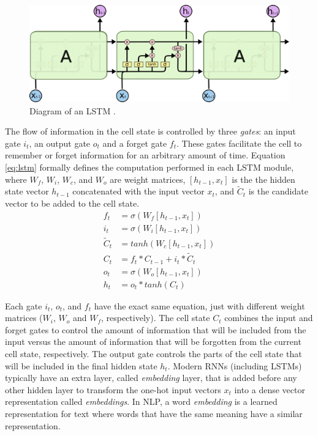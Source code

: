 \begin{figure}[!h]
\centering
\includegraphics[width=0.9\columnwidth]{imgs/background/lstm.png}
\caption{Diagram of an LSTM \cite{olah2015understanding}.}
\label{fig:lstm}
\end{figure}

The flow of information in the cell state is controlled by three \textit{gates}: an input gate $i_t$, an output gate $o_t$ and a forget gate $f_t$. These gates facilitate the cell to remember or forget information for an arbitrary amount of time. Equation \ref{eq:lstm} formally defines the computation performed in each LSTM module, where $W_f$, $W_i$, $W_c$, and $W_o$ are weight matrices, $[h_{t-1}, x_t]$ is the the hidden state vector $h_{t-1}$ concatenated with the input vector $x_t$, and $\tilde{C}_t$ is the candidate vector to be added to the cell state.
\begin{equation} \label{eq:lstm}
\begin{split}
    f_t &= \sigma(W_f[h_{t-1}, x_t]) \\
    i_t &= \sigma(W_i[h_{t-1}, x_t]) \\
    \tilde{C}_t &= tanh(W_c[h_{t-1},x_t]) \\
    C_t &= f_t * C_{t-1} + i_t * \tilde{C}_t \\
    o_t &= \sigma(W_o[h_{t-1}, x_t]) \\
    h_t &= o_t * tanh(C_t)
\end{split}
\end{equation}

Each gate $i_t$, $o_t$, and $f_t$ have the exact same equation, just with different weight matrices ($W_i$, $W_o$ and $W_f$, respectively). The cell state $C_t$ combines the input and forget gates to control the amount of information that will be included from the input versus the amount of information that will be forgotten from the current cell state, respectively. The output gate controls the parts of the cell state that will be included in the final hidden state $h_t$. Modern RNNs (including LSTMs) typically have an extra layer, called \textit{embedding} layer, that is added before any other hidden layer to transform the one-hot input vectors $x_t$ into a dense vector representation called \textit{embeddings}. In NLP, a word \textit{embedding} is a learned representation for text where words that have the same meaning have a similar representation.

